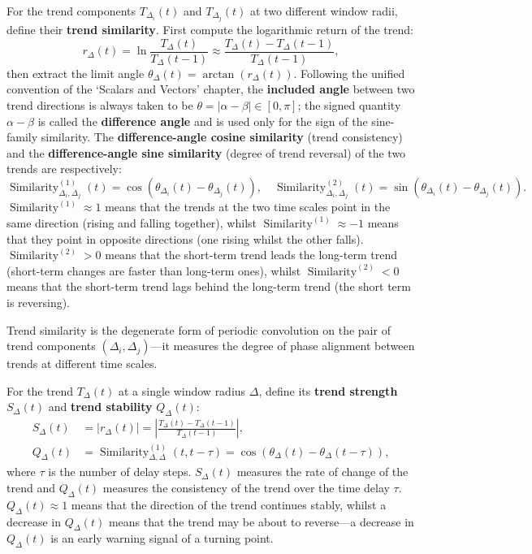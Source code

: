 \begin{definition}\label{def:trend_similarity_data}
For the trend components $T_{\Delta_i}(t)$ and $T_{\Delta_j}(t)$ at two different window radii, define their \textbf{trend similarity}. First compute the logarithmic return of the trend:
\[
r_{\Delta}(t) = \ln\frac{T_{\Delta}(t)}{T_{\Delta}(t-1)} \approx \frac{T_{\Delta}(t) - T_{\Delta}(t-1)}{T_{\Delta}(t-1)},
\]
then extract the limit angle $\theta_{\Delta}(t) = \arctan(r_{\Delta}(t))$. Following the unified convention of the `Scalars and Vectors' chapter, the \textbf{included angle} between two trend directions is always taken to be $\theta=\lvert\alpha-\beta\rvert\in[0,\pi]$; the signed quantity $\alpha-\beta$ is called the \textbf{difference angle} and is used only for the sign of the sine-family similarity. The \textbf{difference-angle cosine similarity} (trend consistency) and the \textbf{difference-angle sine similarity} (degree of trend reversal) of the two trends are respectively:
\[
\operatorname{Similarity}^{(1)}_{\Delta_i, \Delta_j}(t) = \cos(\theta_{\Delta_i}(t) - \theta_{\Delta_j}(t)), \quad \operatorname{Similarity}^{(2)}_{\Delta_i, \Delta_j}(t) = \sin(\theta_{\Delta_i}(t) - \theta_{\Delta_j}(t)).
\]
$\operatorname{Similarity}^{(1)} \approx 1$ means that the trends at the two time scales point in the same direction (rising and falling together), whilst $\operatorname{Similarity}^{(1)} \approx -1$ means that they point in opposite directions (one rising whilst the other falls). $\operatorname{Similarity}^{(2)} > 0$ means that the short-term trend leads the long-term trend (short-term changes are faster than long-term ones), whilst $\operatorname{Similarity}^{(2)} < 0$ means that the short-term trend lags behind the long-term trend (the short term is reversing).

Trend similarity is the degenerate form of periodic convolution on the pair of trend components $(\Delta_i, \Delta_j)$---it measures the degree of phase alignment between trends at different time scales.
\end{definition}

\begin{proposition}\label{prop:trend_strength_stability}
For the trend $T_\Delta(t)$ at a single window radius $\Delta$, define its \textbf{trend strength} $S_\Delta(t)$ and \textbf{trend stability} $Q_\Delta(t)$:
\[
\begin{aligned}
S_\Delta(t) &= |r_\Delta(t)| = \left|\frac{T_\Delta(t) - T_\Delta(t-1)}{T_\Delta(t-1)}\right|, \\
Q_\Delta(t) &= \operatorname{Similarity}^{(1)}_{\Delta, \Delta}(t, t-\tau) = \cos(\theta_\Delta(t) - \theta_\Delta(t-\tau)),
\end{aligned}
\]
where $\tau$ is the number of delay steps. $S_\Delta(t)$ measures the rate of change of the trend and $Q_\Delta(t)$ measures the consistency of the trend over the time delay $\tau$. $Q_\Delta(t) \approx 1$ means that the direction of the trend continues stably, whilst a decrease in $Q_\Delta(t)$ means that the trend may be about to reverse---a decrease in $Q_\Delta(t)$ is an early warning signal of a turning point.
\end{proposition}

